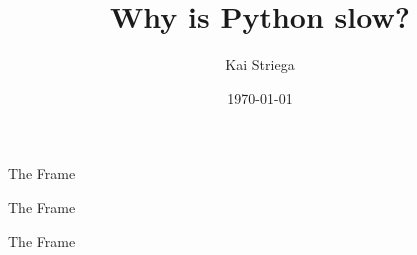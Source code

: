 \documentclass[14pt, aspectration=169]{beamer}
\title{Why is Python slow?}
\author{Kai Striega}
\date{\today}
\begin{document}
\maketitle
\begin{frame}{The Frame}
    
\end{frame}

\begin{frame}{The Frame}
    
\end{frame}

\begin{frame}{The Frame}
    
\end{frame}
\end{document}
